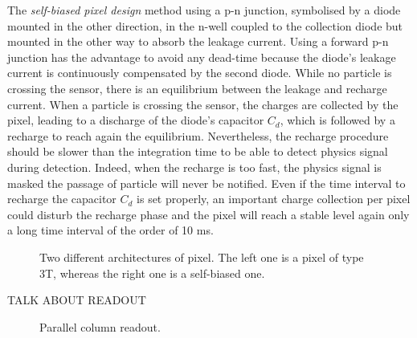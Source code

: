     
    The \textit{self-biased pixel design} method using a p-n junction, symbolised by a diode mounted in the other direction, in the n-well coupled to the collection diode but mounted in the other way to absorb the leakage current.
    Using a forward p-n junction has the advantage to avoid any dead-time because the diode's leakage current is continuously compensated by the second diode.
    While no particle is crossing the sensor, there is an equilibrium between the leakage and recharge current.
    When a particle is crossing the sensor, the charges are collected by the pixel, leading to a discharge of the diode's capacitor $C_d$, which is followed by a recharge to reach again the equilibrium.
    Nevertheless, the recharge procedure should be slower than the integration time to be able to detect physics signal during detection.
    Indeed, when the recharge is too fast, the physics signal is masked the passage of particle will never be notified.
    Even if the time interval to recharge the capacitor $C_d$ is set properly, an important charge collection per pixel could disturb the recharge phase and the pixel will reach a stable level again only a long time interval of the order of 10 ms.

    \begin{figure}[!h]
      \label{fig:elecArch}
      \caption{Two different architectures of pixel. The left one is a pixel of type 3T, whereas the right one is a self-biased one.}
    \end{figure}

    TALK ABOUT READOUT

    \begin{figure}[!h]
      \label{fig:rollShut}
      \caption{Parallel column readout.}
    \end{figure}

